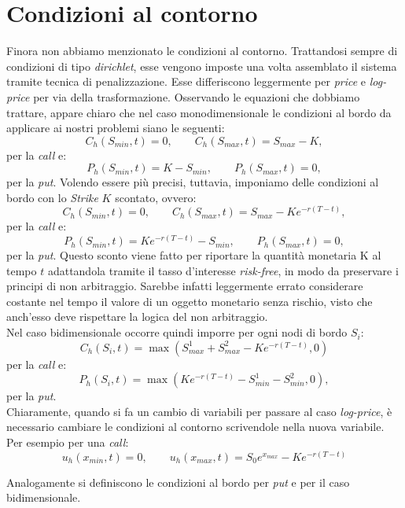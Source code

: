 \documentclass[a4paper,10pt]{report}
\theoremstyle{plain}
\theoremstyle{definition}
\theoremstyle{remark}
\begin{document}
\section{Condizioni al contorno}
Finora non abbiamo menzionato le condizioni al contorno. Trattandosi sempre di condizioni di tipo \emph{dirichlet}, esse vengono imposte una volta assemblato il sistema tramite tecnica di penalizzazione. Esse differiscono leggermente per \emph{price} e \emph{log-price} per via della trasformazione. Osservando le equazioni che dobbiamo trattare, appare chiaro che nel caso monodimensionale le condizioni al bordo da applicare ai nostri problemi siano le seguenti: $$C_h(S_{min},t)=0, \qquad C_h(S_{max},t)=S_{max}-K,$$ per la \emph{call} e:
\begin{equation}
\label{putam_cc}
P_h(S_{min},t)=K-S_{min}, \qquad P_h(S_{max},t)=0,
\end{equation}
per la \emph{put}. Volendo essere pi\`u precisi, tuttavia, imponiamo delle condizioni al bordo con lo \emph{Strike} $K$ scontato, ovvero: $$C_h(S_{min},t)=0, \qquad C_h(S_{max},t)=S_{max}-Ke^{-r(T-t)},$$ per la \emph{call} e: $$P_h(S_{min},t)=Ke^{-r(T-t)}-S_{min}, \qquad P_h(S_{max},t)=0,$$ per la \emph{put}. Questo sconto viene fatto per riportare la quantità monetaria K al tempo $t$ adattandola tramite il tasso d'interesse \emph{risk-free}, in modo da preservare i principi di non arbitraggio. Sarebbe infatti leggermente errato considerare costante nel tempo il valore di un oggetto monetario senza rischio, visto che anch'esso deve rispettare la logica del non arbitraggio.\\Nel caso bidimensionale occorre quindi imporre per ogni nodi di bordo $S_i$: $$C_h(S_i,t)=\max\left(S^1_{max}+S^2_{max}-Ke^{-r(T-t)},0\right)$$per la \emph{call} e: $$P_h(S_i,t)=\max\left(Ke^{-r(T-t)}-S^1_{min}-S^2_{min},0\right),$$ per la \emph{put}.\\
Chiaramente, quando si fa un cambio di variabili per passare al caso \emph{log-price}, è necessario cambiare le condizioni al contorno scrivendole nella nuova variabile. Per esempio per una \emph{call}:
\begin{equation*}
 u_h(x_{min},t)=0, \qquad u_h(x_{max},t)=S_0 e^{x_{max}}-Ke^{-r(T-t)}
\end{equation*}

Analogamente si definiscono le condizioni al bordo per \emph{put} e per il caso bidimensionale.
\end{document}
